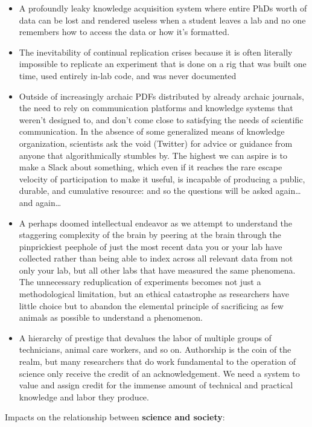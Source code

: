 \documentclass[10pt]{article}
\begin{document}
\begin{multicols}{2}
\begin{itemize}
\item
  A profoundly leaky knowledge acquisition system where entire PhDs
  worth of data can be lost and rendered useless when a student leaves a
  lab and no one remembers how to access the data or how it's formatted.
\item
  The inevitability of continual replication crises because it is often
  literally impossible to replicate an experiment that is done on a rig
  that was built one time, used entirely in-lab code, and was never
  documented
\item
  Outside of increasingly archaic PDFs distributed by already archaic
  journals, the need to rely on communication platforms and knowledge
  systems that weren't designed to, and don't come close to satisfying
  the needs of scientific communication. In the absence of some
  generalized means of knowledge organization, scientists ask the void
  (Twitter) for advice or guidance from anyone that algorithmically
  stumbles by. The highest we can aspire is to make a Slack about
  something, which even if it reaches the rare escape velocity of
  participation to make it useful, is incapable of producing a public,
  durable, and cumulative resource: and so the questions will be asked
  again\ldots{} and again\ldots{}
\item
  A perhaps doomed intellectual endeavor as we attempt to understand the staggering
  complexity of the brain by peering at the brain through the
  pinprickiest peephole of just the most recent data you or your lab
  have collected rather than being able to index across all relevant
  data from not only your lab, but all other labs that have measured the
  same phenomena. The unnecessary reduplication of experiments becomes
  not just a methodological limitation, but an ethical catastrophe as
  researchers have little choice but to abandon the elemental principle
  of sacrificing as few animals as possible to understand a phenomenon.
\item
  A hierarchy of prestige that devalues the labor of multiple groups of
  technicians, animal care workers, and so on. Authorship is the coin of
  the realm, but many researchers that do work fundamental to the
  operation of science only receive the credit of an acknowledgement. We
  need a system to value and assign credit for the immense amount of
  technical and practical knowledge and labor they produce.
\end{itemize}

Impacts on the relationship between \textbf{science and society}:


\end{multicols}
\end{document}
